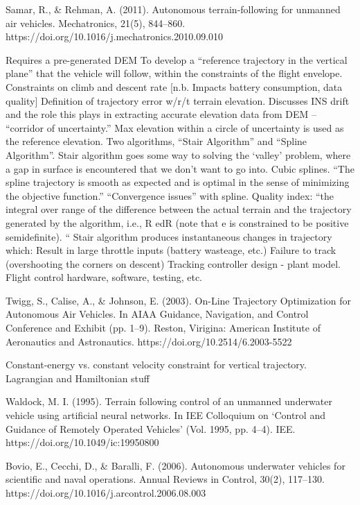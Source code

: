 \documentclass[10pt]{article}
\begin{document}
\cite{Samar2011}
Samar, R., \& Rehman, A. (2011). Autonomous terrain-following for unmanned air vehicles. Mechatronics, 21(5), 844–860. https://doi.org/10.1016/j.mechatronics.2010.09.010

Requires a pre-generated DEM
To develop a “reference trajectory in the vertical plane” that the vehicle will follow, within the constraints of the flight envelope.
Constraints on climb and descent rate [n.b. Impacts battery consumption, data quality]
Definition of trajectory error w/r/t terrain elevation.
Discusses INS drift and the role this plays in extracting accurate elevation data from DEM -- “corridor of uncertainty.”
Max elevation within a circle of uncertainty is used as the reference elevation.
Two algorithms, “Stair Algorithm” and “Spline Algorithm”.
Stair algorithm goes some way to solving the ‘valley’ problem, where a gap in surface is encountered that we don’t want to go into.
Cubic splines.
“The spline trajectory is smooth as expected and is optimal in the sense of minimizing the objective function.”
“Convergence issues” with spline.
Quality index: “the integral over range of the difference between the actual terrain and the trajectory generated by the algorithm, i.e., R edR (note that e is constrained to be positive semidefinite). “
Stair algorithm produces instantaneous changes in trajectory which:
Result in large throttle inputs (battery wasteage, etc.)
Failure to track (overshooting the corners on descent)
Tracking controller design - plant model.
Flight control hardware, software, testing, etc.

\cite{Twigg2003}
Twigg, S., Calise, A., \& Johnson, E. (2003). On-Line Trajectory Optimization for Autonomous Air Vehicles. In AIAA Guidance, Navigation, and Control Conference and Exhibit (pp. 1–9). Reston, Virigina: American Institute of Aeronautics and Astronautics. https://doi.org/10.2514/6.2003-5522

Constant-energy vs. constant velocity constraint for vertical trajectory.
Lagrangian and Hamiltonian stuff

\cite{Waldock1995}
Waldock, M. I. (1995). Terrain following control of an unmanned underwater vehicle using artificial neural networks. In IEE Colloquium on `Control and Guidance of Remotely Operated Vehicles’ (Vol. 1995, pp. 4–4). IEE. https://doi.org/10.1049/ic:19950800

\cite{Bovio2006}
Bovio, E., Cecchi, D., \& Baralli, F. (2006). Autonomous underwater vehicles for scientific and naval operations. Annual Reviews in Control, 30(2), 117–130. https://doi.org/10.1016/j.arcontrol.2006.08.003
\end{document}
